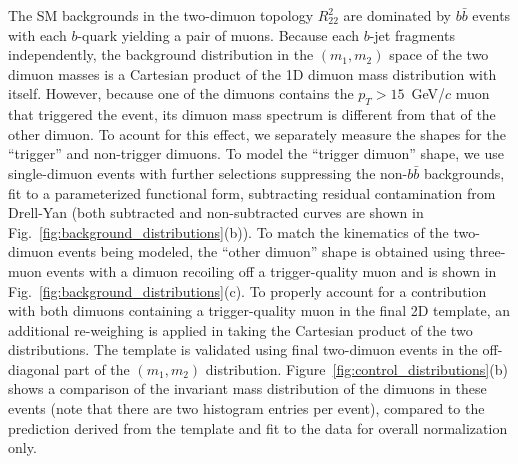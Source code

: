 The SM backgrounds in the two-dimuon topology $R^2_{22}$ are dominated by $b\bar{b}$ events with each $b$-quark yielding a pair of muons. Because each $b$-jet fragments independently, the background distribution in the $(m_1,m_2)$ space of the two dimuon masses is a Cartesian product of the 1D dimuon mass distribution with itself. However, because one of the dimuons contains the $p_T > 15$~GeV/$c$ muon that triggered the event, its dimuon mass spectrum is different from that of the other dimuon. To acount for this effect, we separately measure the shapes for the ``trigger'' and non-trigger dimuons. To model the ``trigger dimuon'' shape, we use single-dimuon events with further selections suppressing the non-$b\bar{b}$ backgrounds, fit to a parameterized functional form, subtracting residual contamination from Drell-Yan (both subtracted and non-subtracted curves are shown in Fig.~\ref{fig:background_distributions}(b)). To match the kinematics of the two-dimuon events being modeled, the ``other dimuon'' shape is obtained using three-muon events with a dimuon recoiling off a trigger-quality muon and is shown in Fig.~\ref{fig:background_distributions}(c). To properly account for a contribution with both dimuons containing a trigger-quality muon in the final 2D template, an additional re-weighing is applied in taking the Cartesian product of the two distributions. The template is validated using final two-dimuon events in the off-diagonal part of the $(m_1,m_2)$ distribution. Figure~\ref{fig:control_distributions}(b) shows a comparison of the invariant mass distribution of the dimuons in these events (note that there are two histogram entries per event), compared to the prediction derived from the template and fit to the data for overall normalization only. 

